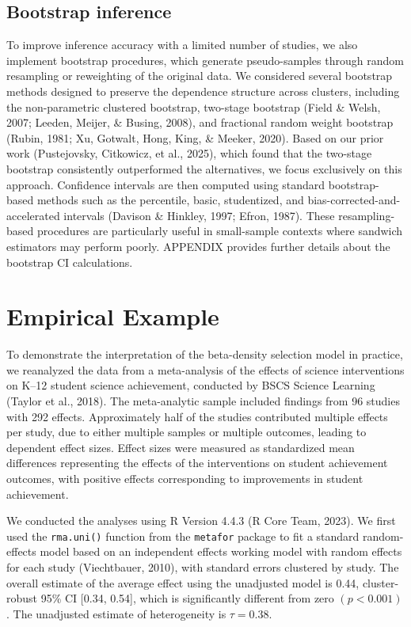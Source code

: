 \documentclass[
  man, donotrepeattitle,floatsintext]{apa7}
\begin{document}
\subsection{Bootstrap inference}\label{bootstrap-inference}

To improve inference accuracy with a limited number of studies, we also implement bootstrap procedures, which generate pseudo-samples through random resampling or reweighting of the original data. We considered several bootstrap methods designed to preserve the dependence structure across clusters, including the non-parametric clustered bootstrap, two-stage bootstrap (Field \& Welsh, 2007; Leeden, Meijer, \& Busing, 2008), and fractional random weight bootstrap (Rubin, 1981; Xu, Gotwalt, Hong, King, \& Meeker, 2020). Based on our prior work (Pustejovsky, Citkowicz, et al., 2025), which found that the two-stage bootstrap consistently outperformed the alternatives, we focus exclusively on this approach. Confidence intervals are then computed using standard bootstrap-based methods such as the percentile, basic, studentized, and bias-corrected-and-accelerated intervals (Davison \& Hinkley, 1997; Efron, 1987). These resampling-based procedures are particularly useful in small-sample contexts where sandwich estimators may perform poorly. APPENDIX provides further details about the bootstrap CI calculations.

\section{Empirical Example}\label{empirical-example}

To demonstrate the interpretation of the beta-density selection model in practice, we reanalyzed the data from a meta-analysis of the effects of science interventions on K--12 student science achievement, conducted by BSCS Science Learning (Taylor et al., 2018). The meta-analytic sample included findings from 96 studies with 292 effects. Approximately half of the studies contributed multiple effects per study, due to either multiple samples or multiple outcomes, leading to dependent effect sizes. Effect sizes were measured as standardized mean differences representing the effects of the interventions on student achievement outcomes, with positive effects corresponding to improvements in student achievement.

We conducted the analyses using R Version 4.4.3 (R Core Team, 2023).
We first used the \texttt{rma.uni()} function from the \texttt{metafor} package to fit a standard random-effects model based on an independent effects working model with random effects for each study (Viechtbauer, 2010), with standard errors clustered by study.
The overall estimate of the average effect using the unadjusted model is 0.44, cluster-robust 95\% CI {[}0.34, 0.54{]}, which is significantly different from zero \((p <0.001)\).
The unadjusted estimate of heterogeneity is \(\tau = 0.38\).
\end{document}
